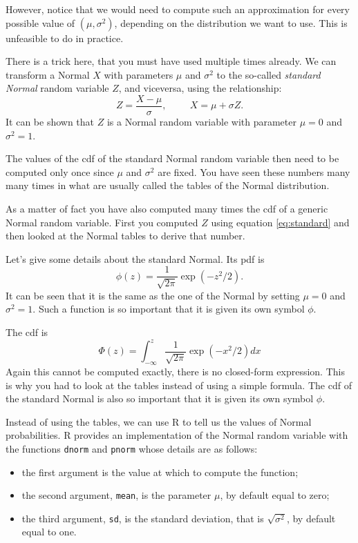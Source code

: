 \documentclass[
]{book}
\begin{document}
However, notice that we would need to compute such an approximation for every possible value of \((\mu,\sigma^2)\), depending on the distribution we want to use. This is unfeasible to do in practice.

There is a trick here, that you must have used multiple times already. We can transform a Normal \(X\) with parameters \(\mu\) and \(\sigma^2\) to the so-called \emph{standard Normal} random variable \(Z\), and viceversa, using the relationship:
\begin{equation}
 \label{eq:standard}
Z = \frac{X-\mu}{\sigma}, \hspace{1cm} X= \mu + \sigma Z.
\end{equation}
It can be shown that \(Z\) is a Normal random variable with parameter \(\mu=0\) and \(\sigma^2=1\).

The values of the cdf of the standard Normal random variable then need to be computed only once since \(\mu\) and \(\sigma^2\) are fixed. You have seen these numbers many many times in what are usually called the tables of the Normal distribution.

As a matter of fact you have also computed many times the cdf of a generic Normal random variable. First you computed \(Z\) using equation \eqref{eq:standard} and then looked at the Normal tables to derive that number.

Let's give some details about the standard Normal. Its pdf is
\[
\phi(z)=\frac{1}{\sqrt{2\pi}}\exp\left(-z^2/2\right).
\]
It can be seen that it is the same as the one of the Normal by setting \(\mu=0\) and \(\sigma^2=1\). Such a function is so important that it is given its own symbol \(\phi\).

The cdf is
\[
\Phi(z)=\int_{-\infty}^z\frac{1}{\sqrt{2\pi}}\exp\left(-x^2/2\right)dx
\]
Again this cannot be computed exactly, there is no closed-form expression. This is why you had to look at the tables instead of using a simple formula. The cdf of the standard Normal is also so important that it is given its own symbol \(\phi\).

Instead of using the tables, we can use R to tell us the values of Normal probabilities. R provides an implementation of the Normal random variable with the functions \texttt{dnorm} and \texttt{pnorm} whose details are as follows:

\begin{itemize}
\item
  the first argument is the value at which to compute the function;
\item
  the second argument, \texttt{mean}, is the parameter \(\mu\), by default equal to zero;
\item
  the third argument, \texttt{sd}, is the standard deviation, that is \(\sqrt{\sigma^2}\), by default equal to one.
\end{itemize}
\end{document}

